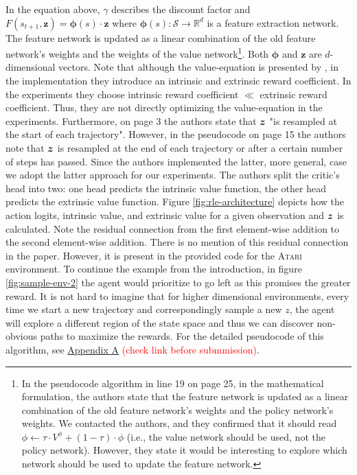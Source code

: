 \documentclass[10pt]{article} %
\begin{document}
\noindent In the equation above, $\gamma$ describes the discount factor and $F(s_{t+1}, \textbf{z}) =  \boldsymbol{\phi}(s) \cdot \textbf{z}$ where $\boldsymbol{\phi}(s): \mathcal{S} \rightarrow \mathbb{R}^{d}$ is a feature extraction network. The feature network is updated as a linear combination of the old feature network's weights and the weights of the value network\footnote{In the pseudocode algorithm in line 19 on page 25, in the mathematical formulation, the authors state that the feature network is updated as a linear combination of the old feature network's weights and the policy network's weights. We contacted the authors, and they confirmed that it should read $\phi \leftarrow \tau \cdot V^\phi + (1 - \tau ) \cdot \phi$ (i.e., the value network should be used, not the policy network). However, they state it would be interesting to explore which network should be used to update the feature network.}. Both $\boldsymbol{\phi}$ and $\textbf{z}$ are $d$-dimensional vectors. Note that although the value-equation is presented by \cite{rle-paper}, in the implementation they introduce an intrinsic and extrinsic reward coefficient. In the experiments they choose intrinsic reward coefficient $\ll$ extrinsic reward coefficient. Thus, they are not directly optimizing the value-equation in the experiments. Furthermore, on page 3 the authors state that ${\bm{z}}$ "is resampled at the start of each trajectory". However, in the pseudocode on page 15 the authors note that ${\bm{z}}$ is resampled at the end of each trajectory or after a certain number of steps has passed. Since the authors implemented the latter, more general, case we adopt the latter approach for our experiments. The authors split the critic's head into two: one head predicts the intrinsic value function, the other head predicts the extrinsic value function. Figure \ref{fig:rle-architecture} depicts how the action logits, intrinsic value, and extrinsic value for a given observation and ${\bm{z}}$ is calculated. Note the residual connection from the first element-wise addition to the second element-wise addition. There is no mention of this residual connection in the paper. However, it is present in the provided code for the \textsc{Atari} environment. To continue the example from the introduction, in figure \ref{fig:sample-env-2} the agent would prioritize to go left as this promises the greater reward. It is not hard to imagine that for higher dimensional environments, every time we start a new trajectory and correspondingly sample a new $z$, the agent will explore a different region of the state space and thus we can discover non-obvious paths to maximize the rewards. For the detailed pseudocode of this algorithm, see \hyperlink{algo-rle}{Appendix A} \textcolor{red}{(check link before submmission)}.
\end{document}
